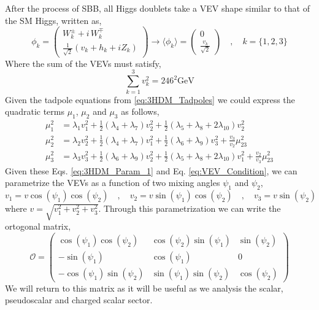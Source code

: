 After the process of SBB, all Higgs doublets take a VEV shape similar to that of the SM Higgs, written as, 
%
\begin{equation}
\phi_k = 
\begin{pmatrix}
W_k^\pm + i \, W_k^\mp \\ 
\frac{1}{\sqrt{2}}\left( v_k + h_k + i Z_k \right)
\end{pmatrix}  \rightarrow \langle \phi_k \rangle = \begin{pmatrix}
0 \\ 
\frac{v_k}{\sqrt{2}}
\end{pmatrix} \quad , \quad k=\{ 1,2,3\} 
\label{shame}
\end{equation} 
Where the sum of the VEVs must satisfy, 
\begin{equation}
\label{eq:VEV_Condition}
\sum_{k=1}^3 v_k^2 = 246^2 \text{GeV}
\end{equation}
%
Given the tadpole equations from \ref{eq:3HDM_Tadpoles} we could express the quadratic terms $\mu_1$, $\mu_2$ and $\mu_3$ as follows, 
%
\begin{equation}
\label{eq:3HDM_Param_1}
\begin{split}
\mu_1^2 & = \lambda_1 v_1^2 + \frac{1}{2} \left( \lambda_4 + \lambda_7 \right) v^2_2 + \frac{1}{2} \left( \lambda_5 + \lambda_8 + 2 \lambda_{10} \right) v_2^2  \\ 
\mu_2^2 & = \lambda_2 v_2^2 + \frac{1}{2} \left( \lambda_4 + \lambda_7 \right) v_1^2 + \frac{1}{2} \left( \lambda_6 + \lambda_9 \right) v_3^2 +\frac{v_3}{v_2} \mu^2_{23}  \\
\mu_3^2 & = \lambda_3 v^2_3  + \frac{1}{2}\left( \lambda_6 + \lambda_9 \right) v^2_2 + \frac{1}{2} \left( \lambda_5 + \lambda_8 + 2 \lambda_{10} \right)v_1^2 + \frac{v_2}{v_3} \mu_{23}^2 
\end{split}  
\end{equation}
Given these Eqs. \ref{eq:3HDM_Param_1} and Eq. \ref{eq:VEV_Condition}, we can parametrize the VEVs as a function of two mixing angles $\psi_1$ and $\psi_2$, 
\begin{equation}
v_1 = v \cos(\psi_1) \cos(\psi_2) \quad , \quad v_2 = v \sin(\psi_1) \cos(\psi_2) \quad , \quad v_3 = v \sin(\psi_2)
\end{equation}
where $v=\sqrt{v_1^2 + v_2^2 + v_3^2 }$. Through this parametrization we can write the ortogonal matrix, 
\begin{equation}
\mathcal{O} = 
\begin{pmatrix}
\cos(\psi_1) \cos(\psi_2) & \cos(\psi_2) \sin(\psi_1) & \sin(\psi_2) \\ 
- \sin(\psi_1) & \cos(\psi_1) & 0 \\ 
- \cos(\psi_1) \sin(\psi_2) & \sin(\psi_1) \sin(\psi_2) & \cos(\psi_2)
\end{pmatrix}
\end{equation}
We will return to this matrix as it will be useful as we analysis the scalar, pseudoscalar and charged scalar sector. 

